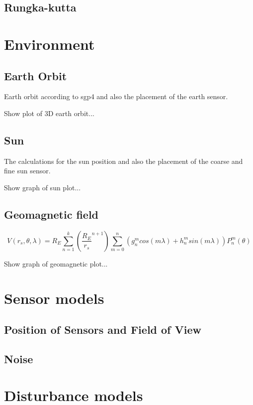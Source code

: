 \subsection{Rungka-kutta}

\section{Environment}
\subsection{Earth Orbit}
Earth orbit according to sgp4 and also the placement of the earth sensor.

Show plot of 3D earth orbit...

\subsection{Sun}
The calculations for the sun position and also the placement of the coarse and fine sun sensor.

Show graph of sun plot...

\subsection{Geomagnetic field}

\begin{equation}
\label{Eq-Geomagnetic_field}
V(r_s,\theta, \lambda) = R_E \sum_{n=1}^{k}\left(\frac{R_E}{r_s}^{n+1}\right)\sum_{m=0}^{n}\left(g_n^mcos(m\lambda) + h_n^msin(m\lambda)\right)P_n^m(\theta)
\end{equation}

Show graph of geomagnetic plot...

\section{Sensor models}
\subsection{Position of Sensors and Field of View}

\subsection{Noise}

\section{Disturbance models}
